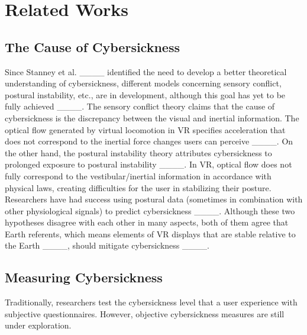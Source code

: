 \section{Related Works}
\subsection{The Cause of Cybersickness}
Since Stanney et al. ____ identified the need to develop a better theoretical understanding of cybersickness, 
different models concerning sensory conflict, postural instability, etc., are in development, although this goal has yet to be fully achieved ____. 
The sensory conflict theory claims that the cause of cybersickness is the discrepancy between the visual and inertial information.
The optical flow generated by virtual locomotion in VR specifies acceleration that does not correspond to the inertial force changes users can perceive ____.
On the other hand, the postural instability theory attributes cybersickness to prolonged exposure to postural instability ____.
In VR, optical flow does not fully correspond to the vestibular/inertial information in accordance with physical laws, creating difficulties for the user in stabilizing their posture.
Researchers have had success using postural data (sometimes in combination with other physiological signals) to predict cybersickness 
____. 
Although these two hypotheses disagree with each other in many aspects, both of them agree that 
Earth referents, which means elements of VR displays that are stable relative to the Earth ____,
should mitigate cybersickness ____.

\subsection{Measuring Cybersickness}

Traditionally, researchers test the cybersickness level that a user experience with subjective questionnaires.
However, objective cybersickness measures are still under exploration.

